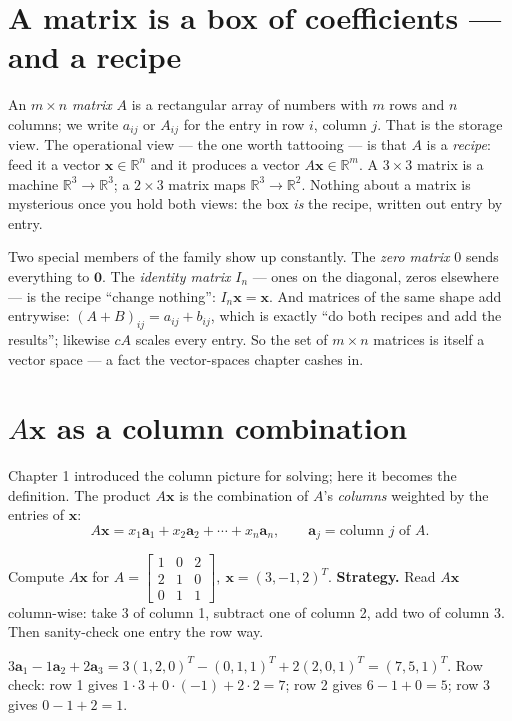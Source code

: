 \section{A matrix is a box of coefficients --- and a recipe}\label{sec:matdef}

An $m\times n$ \emph{matrix} $A$ is a rectangular array of numbers with $m$ rows and $n$ columns; we write $a_{ij}$ or $A_{ij}$ for the entry in row $i$, column $j$. That is the storage view. The operational view — the one worth tattooing — is that $A$ is a \emph{recipe}: feed it a vector $\mathbf{x}\in\mathbb{R}^n$ and it produces a vector $A\mathbf{x}\in\mathbb{R}^m$. A $3\times3$ matrix is a machine $\mathbb{R}^3\to\mathbb{R}^3$; a $2\times3$ matrix maps $\mathbb{R}^3\to\mathbb{R}^2$. Nothing about a matrix is mysterious once you hold both views: the box \emph{is} the recipe, written out entry by entry.

Two special members of the family show up constantly. The \emph{zero matrix} $0$ sends everything to $\mathbf{0}$. The \emph{identity matrix} $I_n$ — ones on the diagonal, zeros elsewhere — is the recipe ``change nothing'': $I_n\mathbf{x}=\mathbf{x}$. And matrices of the same shape add entrywise: $(A+B)_{ij}=a_{ij}+b_{ij}$, which is exactly ``do both recipes and add the results''; likewise $cA$ scales every entry. So the set of $m\times n$ matrices is itself a vector space — a fact the vector-spaces chapter cashes in.

\section{\texorpdfstring{$A\mathbf{x}$}{Ax} as a column combination}\label{sec:axcol}

Chapter 1 introduced the column picture for solving; here it becomes the definition. The product $A\mathbf{x}$ is the combination of $A$'s \emph{columns} weighted by the entries of $\mathbf{x}$:
\[
  A\mathbf{x} = x_1\mathbf{a}_1 + x_2\mathbf{a}_2 + \cdots + x_n\mathbf{a}_n,
  \qquad \mathbf{a}_j = \text{column $j$ of } A.
\]

\begin{example}\label{ex:axcol}
Compute $A\mathbf{x}$ for
\(
  A=\begin{bmatrix} 1 & 0 & 2\\ 2 & 1 & 0\\ 0 & 1 & 1\end{bmatrix},
  \ \mathbf{x}=(3,-1,2)^{T}
\).
\textbf{Strategy.} Read $A\mathbf{x}$ column-wise: take $3$ of column 1, subtract one of column 2, add two of column 3. Then sanity-check one entry the row way.
\begin{solution}
$3\mathbf{a}_1 - 1\mathbf{a}_2 + 2\mathbf{a}_3
 = 3(1,2,0)^{T} - (0,1,1)^{T} + 2(2,0,1)^{T}
 = (7,5,1)^{T}$.
Row check: row 1 gives $1\cdot3+0\cdot(-1)+2\cdot2=7$; row 2 gives $6-1+0=5$; row 3 gives $0-1+2=1$. \checkmark
\end{solution}
\end{example}


